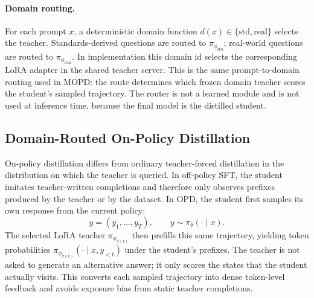\documentclass[sigconf, screen, review, anonymous]{acmart}
\begin{document}
\paragraph{Domain routing.}
\label{subsec:routing}

For each prompt $x$, a deterministic domain function $d(x)\in\{\mathrm{std},\mathrm{real}\}$ selects the teacher. Standards-derived questions are routed to $\pi_{\phi_{\mathrm{std}}}$; real-world questions are routed to $\pi_{\phi_{\mathrm{real}}}$. In implementation this domain id selects the corresponding LoRA adapter in the shared teacher server. This is the same prompt-to-domain routing used in MOPD: the route determines which frozen domain teacher scores the student's sampled trajectory. The router is not a learned module and is not used at inference time, because the final model is the distilled student.

\subsection{Domain-Routed On-Policy Distillation}
\label{subsec:opd}

On-policy distillation differs from ordinary teacher-forced distillation in the distribution on which the teacher is queried. In off-policy SFT, the student imitates teacher-written completions and therefore only observes prefixes produced by the teacher or by the dataset. In OPD, the student first samples its own response from the current policy:
\[
y=(y_1,\ldots,y_T), \qquad
y \sim \pi_\theta(\cdot \mid x).
\]
The selected LoRA teacher $\pi_{\phi_{d(x)}}$ then prefills this same trajectory, yielding token probabilities $\pi_{\phi_{d(x)}}(\cdot \mid x,y_{<t})$ under the student's prefixes. The teacher is not asked to generate an alternative answer; it only scores the states that the student actually visits. This converts each sampled trajectory into dense token-level feedback and avoids exposure bias from static teacher completions.
\end{document}

